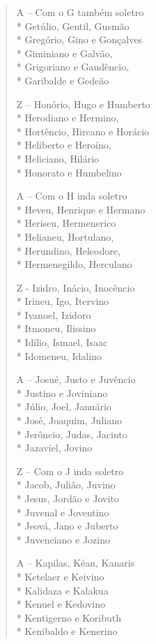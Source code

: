 \begin{verse}
A -- Com o G também soletro\\*
Getúlio, Gentil, Gusmão\\*
Gregório, Gino e Gonçalves\\*
Giminiano e Galvão,\\*
Grigoriano e Gaudêncio,\\*
Garibalde e Gedeão

Z -- Honório, Hugo e Humberto\\*
Herodiano e Hermino,\\*
Hortêncio, Hircano e Horácio\\*
Heliberto e Heroíno,\\*
Heliciano, Hilário\\*
Honorato e Humbelino

A -- Com o H inda soletro\\*
Heveu, Henrique e Hermano\\*
Heriseu, Hermenerico\\*
Helianeu, Hortulano,\\*
Herundino, Heleodore,\\*
Hermenegildo, Herculano

Z - Izidro, Inácio, Inocêncio\\*
Irineu, Igo, Itervino\\*
Ivanoel, Izidoro\\*
Itmoneu, Ilissino\\*
Idílio, Ismael, Isaac\\*
Idomeneu, Idalino

A -- Josué, Justo e Juvêncio\\*
Justino e Joviniano\\*
Júlio, Joel, Januário\\*
José, Joaquim, Juliano\\*
Jerôncio, Judas, Jacinto\\*
Jazaviel, Jovino

Z -- Com o J inda soletro\\*
Jacob, Julião, Juvino\\*
Jesus, Jordão e Jovito\\*
Juvenal e Joventino\\*
Jeová, Jano e Juberto\\*
Juvenciano e Jozino

A -- Kapilas, Kéan, Kanaris\\*
Ketelaer e Keivino\\*
Kalidaza e Kalakua\\*
Kenuel e Kedovino\\*
Kentigerno e Koributh\\*
Kenibaldo e Kenerino


\end{verse}
